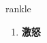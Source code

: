 
\begin{frame}
{\huge rankle}
\begin{center}
\begin{enumerate}\Large
  \item \textbf{激怒}
\end{enumerate}
\end{center}
\end{frame}
